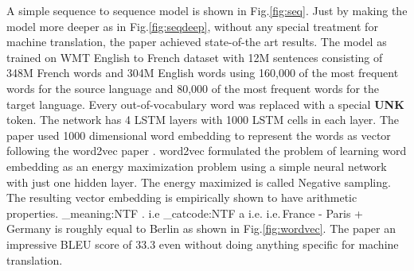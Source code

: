 \documentclass[conference]{IEEEtran}
\makeatletter
\newcommand\latinabbrev[1]{
  \peek_meaning:NTF . {%
    #1\@}%
  { \peek_catcode:NTF a {%
      #1.\@ }%
    {#1.\@}}}
\def\ie{\latinabbrev{i.e}}
\makeatother
\begin{document}
A simple sequence to sequence model is shown in  Fig.\ref{fig:seq}. Just by making the model more deeper as in Fig.\ref{fig:seqdeep}, without any special treatment for machine translation, the paper achieved state-of-the art results. The model as trained on WMT English to French dataset with 12M sentences consisting of 348M French words and 304M English words using 160,000 of the most frequent words for the source language and 80,000 of the most frequent words for the target language. Every out-of-vocabulary word was replaced with a special \textbf{UNK} token. The network has 4 LSTM layers with 1000 LSTM cells in each layer. The paper used 1000 dimensional word embedding to represent the words as vector following the word2vec paper \cite{mikolov2013distributed}. word2vec formulated the problem of learning word embedding as an energy maximization problem using a simple neural network with just one hidden layer. The energy maximized is called Negative sampling. The resulting vector embedding is empirically shown to have arithmetic properties. \ie  $\,$France - Paris + Germany is roughly equal to Berlin as shown in Fig.\ref{fig:wordvec}. The paper an impressive BLEU score of 33.3 even without doing anything specific for machine translation.


\end{document}
